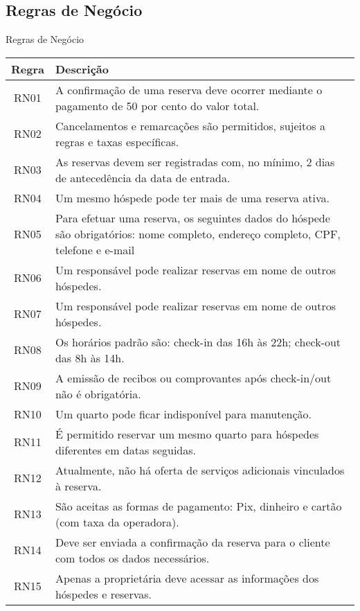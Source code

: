 \documentclass[
	12pt,				%
	openany,			%
	twoside,			%
	a4paper,			%
	english,			%
	french,				%
	spanish,			%
	brazil				%
	]{abntex2}
\begin{document}
\subsection{Regras de Negócio}
\begin{quadro}[H]
	\caption{\label{quadro_rn}Regras de Negócio}
	\begin{tabular}{|c|p{8cm}|}
	\hline
	\textbf{Regra} & \textbf{Descrição}  \\ \hline	
	RN01 & A confirmação de uma reserva deve ocorrer mediante o pagamento de 50 por cento do valor total.   \\ \hline
	RN02 & Cancelamentos e remarcações são permitidos, sujeitos a regras e taxas específicas.   \\ \hline
	RN03 & As reservas devem ser registradas com, no mínimo, 2 dias de antecedência da data de entrada.  \\ \hline
	RN04 & Um mesmo hóspede pode ter mais de uma reserva ativa.   \\ \hline
	RN05 & Para efetuar uma reserva, os seguintes dados do hóspede são obrigatórios: nome completo, endereço completo, CPF, telefone e e-mail   \\ \hline
	RN06 & Um responsável pode realizar reservas em nome de outros hóspedes.   \\ \hline
	RN07 & Um responsável pode realizar reservas em nome de outros hóspedes.   \\ \hline
	RN08 & Os horários padrão são: check-in das 16h às 22h; check-out das 8h às 14h.   \\ \hline
	RN09 & A emissão de recibos ou comprovantes após check-in/out não é obrigatória.   \\ \hline
	RN10 & Um quarto pode ficar indisponível para manutenção.   \\ \hline
	RN11 & É permitido reservar um mesmo quarto para hóspedes diferentes em datas seguidas.   \\ \hline
	RN12 & Atualmente, não há oferta de serviços adicionais vinculados à reserva.   \\ \hline
	RN13 & São aceitas as formas de pagamento: Pix, dinheiro e cartão (com taxa da operadora).   \\ \hline
	RN14 & Deve ser enviada a confirmação da reserva para o cliente com todos os dados necessários.   \\ \hline
	RN15 & Apenas a proprietária deve acessar as informações dos hóspedes e reservas.   \\ \hline
\end{tabular}
\end{quadro}
\end{document}
